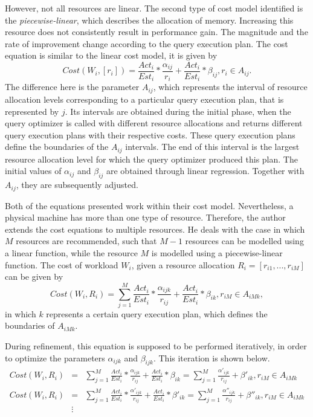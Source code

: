 However, not all resources are linear. The second type of cost model identified is the \textit{piecewise-linear}, which describes the allocation of memory. Increasing this resource does not consistently result in performance gain. The magnitude and the rate of improvement change according to the query execution plan. The cost equation is similar to the linear cost model, it is given by
\[
  Cost(W_{i}, [r_{i}]) = \frac{Act_{i}}{Est_{i}} * \frac{\alpha_{ij}}{r_{i}} + \frac{Act_{i}}{Est_{i}} * \beta_{ij}, r_{i} \in A_{ij}.
\]
The difference here is the parameter $A_{ij}$, which represents the interval of resource allocation levels corresponding to a particular query execution plan, that is represented by $j$. Its intervals are obtained during the initial phase, when the query optimizer is called with different resource allocations and returns different query execution plans with their respective costs. These query execution plans define the boundaries of the $A_{ij}$ intervals. The end of this interval is the largest resource allocation level for which the query optimizer produced this plan. The initial values of $\alpha_{ij}$ and $\beta_{ij}$ are obtained through linear regression. Together with $A_{ij}$, they are subsequently adjusted.

Both of the equations presented work within their cost model. Nevertheless, a physical  machine has more than one type of resource. Therefore, the author extends the cost equations to multiple resources. He deals with the case in which $M$ resources are recommended, such that $M-1$ resources can be modelled using a linear function, while the resource $M$ is modelled using a piecewise-linear function. The cost of workload $W_{i}$, given a resource allocation $R_{i} = [r_{i1},...,r_{iM}]$ can be given by
\[
  Cost(W_{i}, R_{i}) = \sum_{j=1}^{M} \frac{Act_{i}}{Est_{i}} * \frac{\alpha_{ijk}}{r_{ij}} + \frac{Act_{i}}{Est_{i}} * \beta_{ik}, r_{iM} \in A_{iMk},
\]
in which $k$ represents a certain query execution plan, which defines the boundaries of $A_{iMk}$. 

During refinement, this equation is supposed to be performed iteratively, in order to optimize the parameters $\alpha_{ijk}$ and $\beta_{ijk}$. This iteration is shown below.
\begin{eqnarray*}
 Cost(W_{i}, R_{i}) &=& \sum_{j=1}^{M} \frac{Act_{i}}{Est_{i}} * \frac{\alpha_{ijk}}{r_{ij}} + \frac{Act_{i}}{Est_{i}} * \beta_{ik} = \sum_{j=1}^{M} \frac{\alpha'_{ijk}}{r_{ij}} + \beta'_{ik}, r_{iM} \in A_{iMk} \\
 Cost(W_{i}, R_{i}) &=& \sum_{j=1}^{M} \frac{Act_{i}}{Est_{i}} * \frac{\alpha'_{ijk}}{r_{ij}} + \frac{Act_{i}}{Est_{i}} * \beta'_{ik} = \sum_{j=1}^{M} \frac{\alpha''_{ijk}}{r_{ij}} + \beta''_{ik}, r_{iM} \in A_{iMk} \\
  &\vdots&
\end{eqnarray*}

